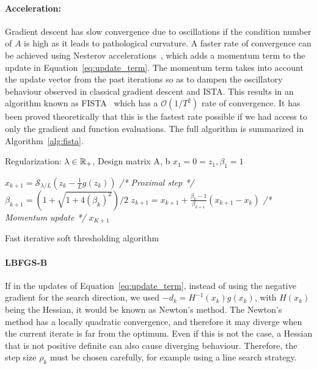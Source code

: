 \paragraph{Acceleration:} Gradient descent has slow convergence due to oscillations if the condition number of $A$ is high as it leads to pathological curvature. A faster rate of convergence can be achieved using Nesterov accelerations~\citep{nesterov1983method}, which adds a momentum term to the update in Equation~\ref{eq:update_term}.
The momentum term takes into account the update vector from the past iterations so as to dampen the oscillatory behaviour observed in classical gradient descent and \ac{ISTA}. 
This results in an algorithm known as \ac{FISTA}~\citep{beck2009fast} which has a $\mathcal{O}(1/T^2)$ rate of convergence. It has been proved theoretically that this is the fastest rate possible if we had access to only the gradient and function evaluations. The full algorithm is summarized in Algorithm~\ref{alg:fista}.

    \begin{algorithm}[H]
      \begin{algorithmic}[1] %
      \REQUIRE Regularization: $\lambda \in \mathbb{R}_+$, Design matrix A, b
      \STATE $x_1=0=z_1, \beta_1=1$
          
          \STATE $x_{k+1} = \mathcal{S}_{\lambda/L}(z_k - \frac{1}{L}g(z_k))$ \textit{\color{blue} /* Proximal step */}
          \STATE $\beta_{k+1} = (1 + \sqrt{1 + 4(\beta_k)^2})/2$
          \STATE $z_{k + 1} = x_{k + 1} + \frac{\beta_k - 1}{\beta_{k + 1}}(x_{k + 1} - x_k)$ \textit{\color{blue} /* Momentum update */}
        \ENDFOR
        \RETURN $x_{K + 1}$
        \end{algorithmic}
        \caption{Fast iterative soft thresholding algorithm}
        \label{alg:fista}
    \end{algorithm}

\paragraph{LBFGS-B}
If in the updates of Equation~\ref{eq:update_term}, instead of using the negative gradient for the search direction, we used $-d_k = H^{-1}(x_k)g(x_k)$, with $H(x_k)$ being the Hessian, it would be known as Newton's method. The Newton's method has a locally quadratic convergence, and therefore it may diverge when the current iterate is far from the optimum. Even if this is not the case, a Hessian that is not positive definite can also cause diverging behaviour. Therefore, the step size $\rho_k$ must be chosen carefully, for example using a line search strategy.

